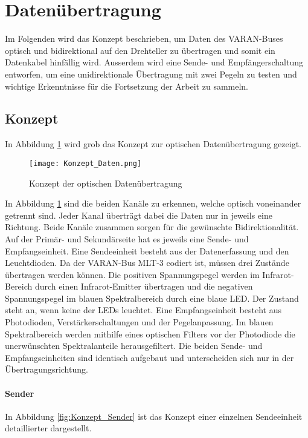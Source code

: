 \section{Datenübertragung}
\label{sec:Daten}
Im Folgenden wird das Konzept beschrieben, um Daten des VARAN-Buses optisch und bidirektional auf den Drehteller zu übertragen und somit ein Datenkabel hinfällig wird. Ausserdem wird eine Sende- und Empfängerschaltung entworfen, um eine unidirektionale Übertragung mit zwei Pegeln zu testen und wichtige Erkenntnisse für die Fortsetzung der Arbeit zu sammeln.  
\subsection{Konzept}
In Abbildung \ref{fig:Konzept_Daten} wird grob das Konzept zur optischen Datenübertragung gezeigt.

\begin{figure}[h]
	\centering
	\texttt{[image: Konzept\_Daten.png]}
	\caption{Konzept der optischen Datenübertragung}\label{fig:Konzept_Daten}
\end{figure}

In Abbildung \ref{fig:Konzept_Daten} sind die beiden Kanäle zu erkennen, welche optisch voneinander getrennt sind. Jeder Kanal überträgt dabei die Daten nur in jeweils eine Richtung. Beide Kanäle zusammen sorgen für die gewünschte Bidirektionalität. Auf der Primär- und Sekundärseite hat es jeweils eine Sende- und Empfangseinheit. 
\newline
Eine Sendeeinheit besteht aus der Datenerfassung und den Leuchtdioden. Da der VARAN-Bus MLT-3 codiert ist, müssen drei Zustände übertragen werden können. Die positiven Spannungspegel werden im Infrarot-Bereich durch einen Infrarot-Emitter übertragen und die negativen Spannungspegel im blauen Spektralbereich durch eine blaue LED. Der Zustand \grqq steht an, wenn keine der LEDs leuchtet.
\newline
Eine Empfangseinheit besteht aus Photodioden, Verstärkerschaltungen und der Pegelanpassung. Im blauen Spektralbereich werden mithilfe eines optischen Filters vor der Photodiode die unerwünschten Spektralanteile herausgefiltert.
\newline Die beiden Sende- und Empfangseinheiten sind identisch aufgebaut und unterscheiden sich nur in der Übertragungsrichtung. \cite{underwater}
\newpage
\paragraph{Sender}
In Abbildung \ref{fig:Konzept_Sender} ist das Konzept einer einzelnen Sendeeinheit detaillierter dargestellt.

